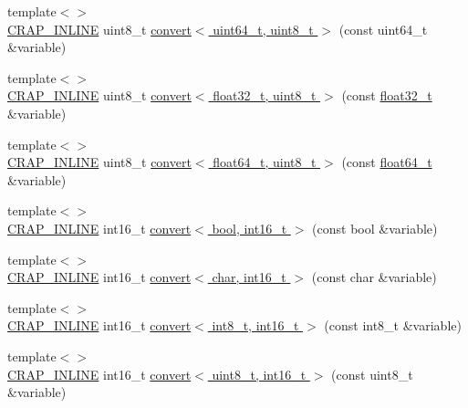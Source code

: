 \begin{DoxyCompactItemize}
\item 
{\footnotesize template$<$$>$ }\\\hyperlink{config__x86_8h_a5a40526b8d842e7ff731509998bb0f1c}{C\+R\+A\+P\+\_\+\+I\+N\+L\+I\+N\+E} uint8\+\_\+t \hyperlink{namespacecrap_a92390f52f832a03334160602cb028b8d}{convert$<$ uint64\+\_\+t, uint8\+\_\+t $>$} (const uint64\+\_\+t \&variable)
\item 
{\footnotesize template$<$$>$ }\\\hyperlink{config__x86_8h_a5a40526b8d842e7ff731509998bb0f1c}{C\+R\+A\+P\+\_\+\+I\+N\+L\+I\+N\+E} uint8\+\_\+t \hyperlink{namespacecrap_aadae3aa46ae252afa2c519085f565ceb}{convert$<$ float32\+\_\+t, uint8\+\_\+t $>$} (const \hyperlink{crap__types_8h_a4611b605e45ab401f02cab15c5e38715}{float32\+\_\+t} \&variable)
\item 
{\footnotesize template$<$$>$ }\\\hyperlink{config__x86_8h_a5a40526b8d842e7ff731509998bb0f1c}{C\+R\+A\+P\+\_\+\+I\+N\+L\+I\+N\+E} uint8\+\_\+t \hyperlink{namespacecrap_a32684fe93a23dda153d5a9179e96333f}{convert$<$ float64\+\_\+t, uint8\+\_\+t $>$} (const \hyperlink{crap__types_8h_ac55f3ae81b5bc9053760baacf57e47f4}{float64\+\_\+t} \&variable)
\item 
{\footnotesize template$<$$>$ }\\\hyperlink{config__x86_8h_a5a40526b8d842e7ff731509998bb0f1c}{C\+R\+A\+P\+\_\+\+I\+N\+L\+I\+N\+E} int16\+\_\+t \hyperlink{namespacecrap_a7b25157df368bc353d22ad493be99d5a}{convert$<$ bool, int16\+\_\+t $>$} (const bool \&variable)
\item 
{\footnotesize template$<$$>$ }\\\hyperlink{config__x86_8h_a5a40526b8d842e7ff731509998bb0f1c}{C\+R\+A\+P\+\_\+\+I\+N\+L\+I\+N\+E} int16\+\_\+t \hyperlink{namespacecrap_ade4b66d735b9f9c83173ccf7373f29a4}{convert$<$ char, int16\+\_\+t $>$} (const char \&variable)
\item 
{\footnotesize template$<$$>$ }\\\hyperlink{config__x86_8h_a5a40526b8d842e7ff731509998bb0f1c}{C\+R\+A\+P\+\_\+\+I\+N\+L\+I\+N\+E} int16\+\_\+t \hyperlink{namespacecrap_aaa8b97e3e1833faa04052dec57cdab84}{convert$<$ int8\+\_\+t, int16\+\_\+t $>$} (const int8\+\_\+t \&variable)
\item 
{\footnotesize template$<$$>$ }\\\hyperlink{config__x86_8h_a5a40526b8d842e7ff731509998bb0f1c}{C\+R\+A\+P\+\_\+\+I\+N\+L\+I\+N\+E} int16\+\_\+t \hyperlink{namespacecrap_a19fce08e3c9a7fa894b2c81264385f7e}{convert$<$ uint8\+\_\+t, int16\+\_\+t $>$} (const uint8\+\_\+t \&variable)

\end{DoxyCompactItemize}
